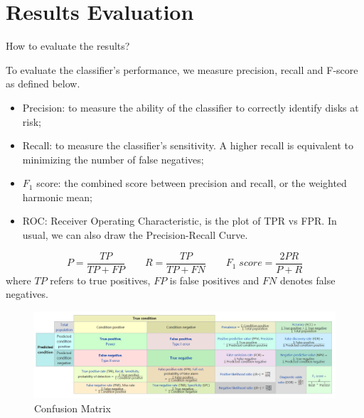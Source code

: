 \documentclass[12pt,a4paper,english]{amsart}
\begin{document}
%
\section{Results Evaluation}

How to evaluate the results?

To evaluate the classifier's performance, we measure precision, recall and F-score as defined below.
\begin{itemize}
	\item Precision: to measure the ability of the classifier to correctly identify disks at risk;
	\item Recall: to measure the classifier's sensitivity. A higher recall is equivalent to minimizing the number of false negatives;
	\item $F_1$ score: the combined score between precision and recall, or the weighted harmonic mean;
	\item ROC: Receiver Operating Characteristic, is the plot of TPR vs FPR. In usual, we can also draw the Precision-Recall Curve.
\end{itemize}

\begin{equation}
	P = \dfrac{TP}{TP+FP} \quad\quad 
	R = \dfrac{TP}{TP+FN} \quad\quad 
	F_{1}\; score = \dfrac{2PR}{P+R}
\end{equation}
where $TP$ refers to true positives, $FP$ is false positives and $FN$ denotes false negatives.




\begin{figure}[htb]
	\centering
	\includegraphics[width=\textwidth]{img/auc.PNG}
	\caption{Confusion Matrix\cite{Wiki}}
\end{figure}
%
\end{document}
